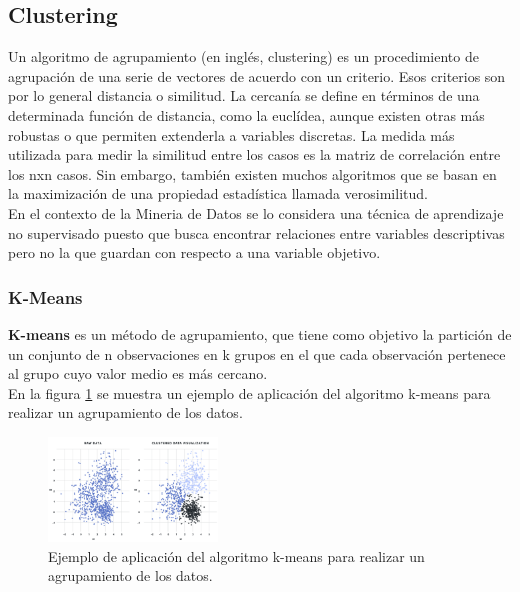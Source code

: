 \documentclass[osajnl,twocolumn,showpacs,superscriptaddress,10pt]{revtex4-1} %
\begin{document}
\subsection{Clustering}

Un algoritmo de agrupamiento (en inglés, clustering) es un procedimiento de agrupación de una serie de vectores de acuerdo con un criterio. Esos criterios son por lo general distancia o similitud. La cercanía se define en términos de una determinada función de distancia, como la euclídea, aunque existen otras más robustas o que permiten extenderla a variables discretas. La medida más utilizada para medir la similitud entre los casos es la matriz de correlación entre los nxn casos. Sin embargo, también existen muchos algoritmos que se basan en la maximización de una propiedad estadística llamada verosimilitud. \\

En el contexto de la Mineria de Datos se lo considera una técnica de aprendizaje no supervisado puesto que busca encontrar relaciones entre variables descriptivas pero no la que guardan con respecto a una variable objetivo. \\

\subsubsection{K-Means}

\textbf{K-means} es un método de agrupamiento, que tiene como objetivo la partición de un conjunto de n observaciones en k grupos en el que cada observación pertenece al grupo cuyo valor medio es más cercano. \\

En la figura \ref{figure:clustering_example} se muestra un ejemplo de aplicación del algoritmo k-means para realizar un agrupamiento de los datos.

\begin{figure}[H]
    \centering
    \includegraphics[width=0.4\textwidth]{theory/clustering}
    \caption{Ejemplo de aplicación del algoritmo k-means para realizar un agrupamiento de los datos.}
    \label{figure:clustering_example}
\end{figure}
\end{document}
